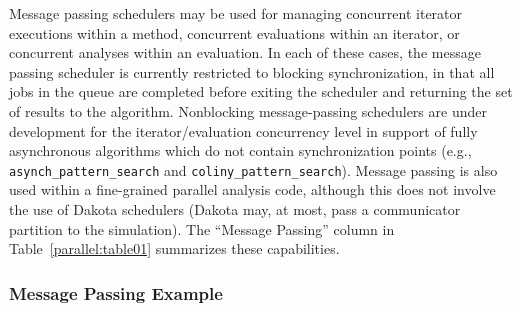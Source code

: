 
Message passing schedulers may be used for managing concurrent
iterator executions within a method, concurrent evaluations within
an iterator, or concurrent analyses within an evaluation.  In each of
these cases, the message passing scheduler is currently restricted to
blocking synchronization, in that all jobs in the queue are completed
before exiting the scheduler and returning the set of results to the
algorithm. Nonblocking message-passing schedulers are under
development for the iterator/evaluation concurrency level in support
of fully asynchronous algorithms which do not contain synchronization
points (e.g., \texttt{asynch\_pattern\_search} and
\texttt{coliny\_pattern\_search}).  Message passing is also used within
a fine-grained parallel analysis code, although this does not involve
the use of Dakota schedulers (Dakota may, at most, pass a communicator
partition to the simulation).  The ``Message Passing'' column in
Table~\ref{parallel:table01} summarizes these capabilities.

\subsubsection{Message Passing Example}\label{parallel:SLP:message:ex}

